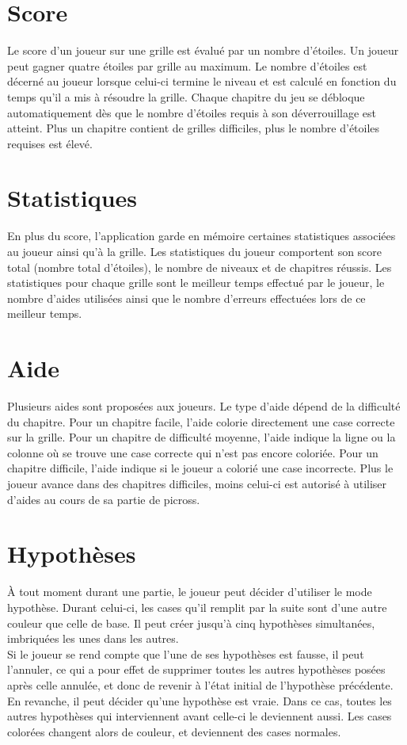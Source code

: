 \documentclass{report}
\begin{document}
		\section{Score}
			Le score d'un joueur sur une grille est évalué par un nombre d'étoiles. Un joueur peut gagner quatre étoiles par grille au maximum. Le nombre d'étoiles est décerné au joueur lorsque celui-ci termine le niveau et est calculé en fonction du temps qu'il a mis à résoudre la grille. Chaque chapitre du jeu se débloque automatiquement dès que le nombre d'étoiles requis à son déverrouillage est atteint. Plus un chapitre contient de grilles difficiles, plus le nombre d'étoiles requises est élevé.
				
		\section{Statistiques}
			En plus du score, l'application garde en mémoire certaines statistiques associées au joueur ainsi qu'à la grille. Les statistiques du joueur comportent son score total (nombre total d'étoiles), le nombre de niveaux et de chapitres réussis. Les statistiques pour chaque grille sont le meilleur temps effectué par le joueur, le nombre d'aides utilisées ainsi que le nombre d'erreurs effectuées lors de ce meilleur temps.
			
		\section{Aide}
			Plusieurs aides sont proposées aux joueurs. Le type d'aide dépend de la difficulté du chapitre. Pour un chapitre facile, l'aide colorie directement une case correcte sur la grille. Pour un chapitre de difficulté moyenne, l'aide indique la ligne ou la colonne où se trouve une case correcte qui n'est pas encore coloriée. Pour un chapitre difficile, l'aide indique si le joueur a colorié une case incorrecte. Plus le joueur avance dans des chapitres difficiles, moins celui-ci est autorisé à utiliser d'aides au cours de sa partie de picross.

		\section{Hypothèses}			
			À tout moment durant une partie, le joueur peut décider d'utiliser le mode hypothèse. Durant celui-ci, les cases qu'il remplit par la suite sont d'une autre couleur que celle de base. Il peut créer jusqu'à cinq hypothèses simultanées, imbriquées les unes dans les autres.\\
			Si le joueur se rend compte que l'une de ses hypothèses est fausse, il peut l'annuler, ce qui a pour effet de supprimer toutes les autres hypothèses posées après celle annulée, et donc de revenir à l'état initial de l'hypothèse précédente.\\
			En revanche, il peut décider qu'une hypothèse est vraie. Dans ce cas, toutes les autres hypothèses qui interviennent avant celle-ci le deviennent aussi. Les cases colorées changent alors de couleur, et deviennent des cases normales.
		
\end{document}
